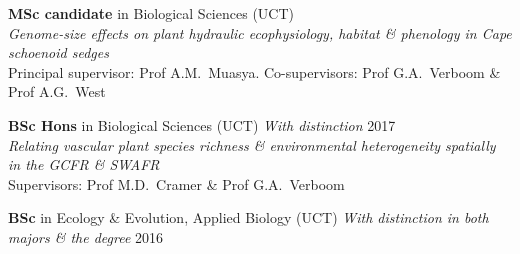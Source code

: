 \begin{hangparas}{2em}{1}

\textbf{MSc candidate} in Biological Sciences {\small (UCT)}              \\
\hspace{2em} \textit{Genome-size effects on plant
  hydraulic ecophysiology, habitat \& phenology in
  Cape schoenoid sedges}                                                  \\
\hspace{2em} Principal supervisor: Prof A.M.~Muasya.
  Co-supervisors:
  Prof G.A.~Verboom \&
  Prof A.G.~West

\textbf{BSc Hons} in Biological Sciences {\small
  (UCT) \textit{With distinction}}                   \hfill {\small 2017} \\
\hspace{2em} \textit{Relating vascular plant species
  richness \& environmental heterogeneity spatially
  in the GCFR \& SWAFR}                                                   \\
\hspace{2em} Supervisors:
  Prof M.D.~Cramer \&
  Prof G.A.~Verboom

\textbf{BSc} in Ecology \& Evolution, Applied
  Biology {\small (UCT) \textit{With distinction in
  both majors \& the degree}}                        \hfill {\small 2016}

\end{hangparas}
